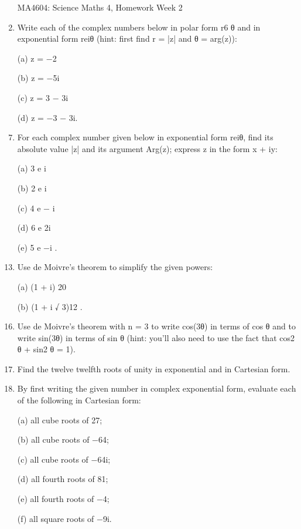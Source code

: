 \begin{enumerate}
\newpage
MA4604: Science Maths 4, Homework Week 2
\item Write each of the complex numbers below in polar form r6 θ and in exponential form reiθ
(hint: first find r = |z| and θ = arg(z)):
\item[(a)] z = −2 \item[(b)] z = −5i \item[(c)] z = 3 − 3i \item[(d)] z = −3 − 3i.
\item For each complex number given below in exponential form reiθ, find its absolute value |z|
and its argument Arg(z); express z in the form x + iy:
\item[(a)] 3 e
i \item[(b)] 2 e
i \item[(c)] 4 e
− i \item[(d)] 6 e
2i\pi \item[(e)] 5 e
−i\pi
.
\item Use de Moivre’s theorem to simplify the given powers: \item[(a)] (1 + i)
20 \item[(b)] (1 + i
√
3)12
.
\item Use de Moivre’s theorem with n = 3 to write cos(3θ) in terms of cos θ and to write sin(3θ)
in terms of sin θ (hint: you’ll also need to use the fact that cos2
θ + sin2
θ = 1).
\item Find the twelve twelfth roots of unity in exponential and in Cartesian form.
\item By first writing the given number in complex exponential form, evaluate each of the
following in Cartesian form: \item[(a)] all cube roots of 27; \item[(b)] all cube roots of −64;
\item[(c)] all cube roots of −64i; \item[(d)] all fourth roots of 81; \item[(e)] all fourth roots of −4;
\item[(f)] all square roots of −9i.

\end{enumerate}
